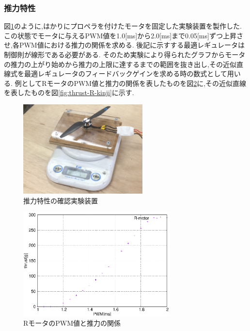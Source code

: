 \documentclass[12pt,oneside]{sotsuken_paper}
\begin{document}
\subsubsection{推力特性}
図\ref{fig:thrust-test}のように,はかりにプロペラを付けたモータを固定した実験装置を製作した.
この状態でモータに与えるPWM値を1.0[ms]から2.0[ms]まで0.05[ms]ずつ上昇させ,各PWM値における推力の関係を求める.
後記に示すする最適レギュレータは制御則が線形である必要がある.
そのため実験により得られたグラフからモータの推力の上がり始めから推力の上限に達するまでの範囲を抜き出し,その近似直線式を最適レギュレータのフィードバックゲインを求める時の数式として用いる.
例としてRモータのPWM値と推力の関係を表したものを図\ref{fig:thrust-R}に,その近似直線を表したものを図\ref{fig:thrust-R-kinji}に示す.

\begin{figure}[htbp]
	\begin{center}
		\includegraphics[width=65mm]{image/thrust/thrust-test.jpg}
		\caption{推力特性の確認実験装置}
		\label{fig:thrust-test}
	\end{center}
\end{figure}

\begin{figure}[htbp]
	\begin{center}
		\includegraphics[width=80mm]{image/thrust/thrust-R.eps}
		\caption{RモータのPWM値と推力の関係}
		\label{fig:thrust-R}
	\end{center}
\end{figure}
\end{document}
